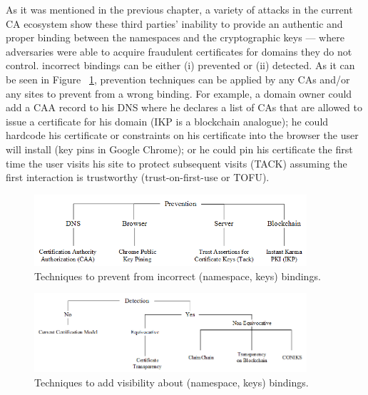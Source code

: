 As it was mentioned in the previous chapter, a variety of attacks in the current CA ecosystem show these third parties' inability to provide an authentic and proper binding between the namespaces and the cryptographic keys --- where adversaries were able to acquire fraudulent certificates for domains they do not control. incorrect bindings can be either (i) prevented or (ii) detected.  As it can be seen in Figure ~\ref{fig:prevention}, prevention techniques can be applied by any CAs and/or any sites to prevent from a wrong binding. For example, a domain owner could add a CAA record to his DNS where he declares a list of CAs that are allowed to issue a certificate for his domain (IKP is a blockchain analogue); he could hardcode his certificate or constraints on his certificate into the browser the user will install (\eg key pins in Google Chrome); or he could pin his certificate the first time the user visits his site to protect subsequent visits (TACK) assuming the first interaction is trustworthy (trust-on-first-use or TOFU). 

\begin{figure}[t]
\centering
\includegraphics[width=0.9\textwidth]{Fig/prevention.png}
\caption{\footnotesize{Techniques to prevent from incorrect (namespace, keys) bindings.}}
\label{fig:prevention}
\end{figure}


\begin{figure}[t]
\centering
\includegraphics[width=0.9\textwidth]{Fig/detection2.png}
\caption{\footnotesize{Techniques to add visibility about (namespace, keys) bindings.}}
\label{fig:detection}
\end{figure}

